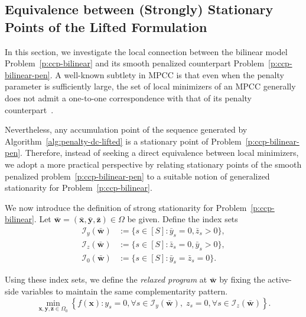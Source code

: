 \documentclass[11pt]{article}
\def\bs{\boldsymbol}
\def\I{\mathcal{I}}
\begin{document}
\subsection{Equivalence between (Strongly) Stationary Points of the Lifted Formulation} 

In this section, we investigate the local connection between the bilinear model Problem~\eqref{p:ccp-bilinear} and its smooth penalized counterpart Problem~\eqref{p:ccp-bilinear-pen}. 
A well-known subtlety in MPCC is that even when the penalty parameter is sufficiently large, the set of local minimizers of an MPCC generally does not admit a one-to-one correspondence with that of its penalty counterpart~\cite{scheel2000mathematical, fang2012pivoting, jara2018study}. 

Nevertheless, any accumulation point of the sequence generated by Algorithm~\ref{alg:penalty-dc-lifted} is a stationary point of Problem~\eqref{p:ccp-bilinear-pen}. Therefore, instead of seeking a direct equivalence between local minimizers, we adopt a more practical perspective by relating stationary points of the smooth penalized problem~\eqref{p:ccp-bilinear-pen} to a suitable notion of generalized stationarity for Problem~\eqref{p:ccp-bilinear}.

We now introduce the definition of strong stationarity for Problem~\eqref{p:ccp-bilinear}. Let $\bar{\bs{w}} =(\bar{\bs{x}},\bar{\bs{y}},\bar{\bs{z}})\in\Omega$ be given. Define the index sets
\begin{align*}
\I_y(\bar{\bs{w}})&:=\{s\in[S]: \bar y_s=0, \bar z_s>0\},\\
\I_z(\bar{\bs{w}})&:=\{s\in[S]: \bar z_s=0, \bar y_s>0\},\\
\I_0(\bar{\bs{w}})&:=\{s\in[S]: \bar y_s=\bar z_s=0\}.
\end{align*}


Using these index sets, we define the \emph{relaxed program} at $\bar{\bs{w}}$ by fixing the active-side variables to maintain the same complementarity pattern. 
\begin{equation}
\label{p:bilinear-relaxed}
\min_{\bs{x},\bs{y},\bs{z} \in \Omega_0}\left\{ f(\bs{x}) : y_s=0,\forall s\in \I_y(\bar{\bs{w}}), \; z_s=0,\forall s\in \I_z(\bar{\bs{w}})\right\}.
\end{equation}
\end{document}
